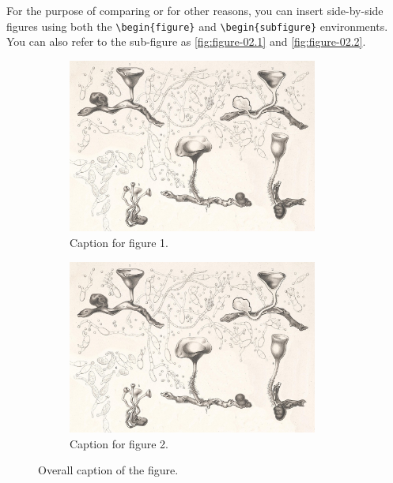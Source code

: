 {For the purpose of comparing or for other reasons, you can insert side-by-side figures using both the \verb|\begin{figure}| and \verb|\begin{subfigure}| environments. You can also refer to the sub-figure as \autoref{fig:figure-02.1} and \autoref{fig:figure-02.2}.

\begin{figure}[!htpb]
    \centering
    \begin{subfigure}{0.45\textwidth}
        \centering
        \includegraphics[width=0.9\textwidth]{Figures/PezizaTuberosa.jpg}
        \caption{Caption for figure 1.}
        \label{fig:figure-02.1}
    \end{subfigure}
    \hspace{.5cm} %
    \begin{subfigure}{0.45\textwidth}
        \centering
        \includegraphics[width=0.9\textwidth]{Figures/PezizaTuberosa.jpg}
        \caption{Caption for figure 2.}
        \label{fig:figure-02.2}
    \end{subfigure}
    \caption{Overall caption of the figure.}
    \label{fig:figure-02}
\end{figure}

}

